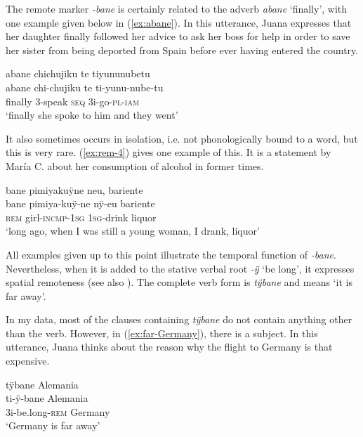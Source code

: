 The remote marker \textit{-bane} is certainly related to the adverb \textit{abane} ‘finally’, with one example given below in (\ref{ex:abane}). In this utterance, Juana expresses that her daughter finally followed her advice to ask her boss for help in order to save her sister from being deported from Spain before ever having entered the country.

\ea\label{ex:abane}
\begingl 
\glpreamble abane chichujiku te tiyununubetu\\
\gla abane chi-chujiku te ti-yunu-nube-tu\\ 
\glb finally 3-speak \textsc{seq} 3i-go-\textsc{pl}-\textsc{iam}\\ 
\glft ‘finally she spoke to him and they went’
\trailingcitation{[jxx-p110923l-1.351]}
\xe

It also sometimes occurs in isolation, i.e. not phonologically bound to a word, but this is very rare. (\ref{ex:rem-4}) gives one example of this. It is a statement by María C. about her consumption of alcohol in former times.

\ea\label{ex:rem-4}
\begingl
\glpreamble bane pimiyakuÿne neu, bariente\\
\gla bane pimiya-kuÿ-ne nÿ-eu bariente\\
\glb \textsc{rem} girl-\textsc{incmp}-1\textsc{sg} 1\textsc{sg}-drink liquor\\
\glft ‘long ago, when I was still a young woman, I drank, liquor’
\endgl
\trailingcitation{[cux-c120414ls-1.031-032]}
\xe


All examples given up to this point illustrate the temporal function of \textit{-bane}. Nevertheless, when it is added to the stative verbal root \textit{-ÿ} ‘be long’, it expresses spatial remoteness (see also ). The complete verb form is \textit{tÿbane} and means ‘it is far away’.

In my data, most of the clauses containing \textit{tÿbane} do not contain anything other than the verb. However, in (\ref{ex:far-Germany}), there is a subject. In this utterance, Juana thinks about the reason why the flight to Germany is that expensive.

\ea\label{ex:far-Germany}
\begingl 
\glpreamble tÿbane Alemania\\
\gla ti-ÿ-bane Alemania\\ 
\glb 3i-be.long-\textsc{rem} Germany\\ 
\glft ‘Germany is far away’
\trailingcitation{[jxx-p120430l-1.172]}
\xe


